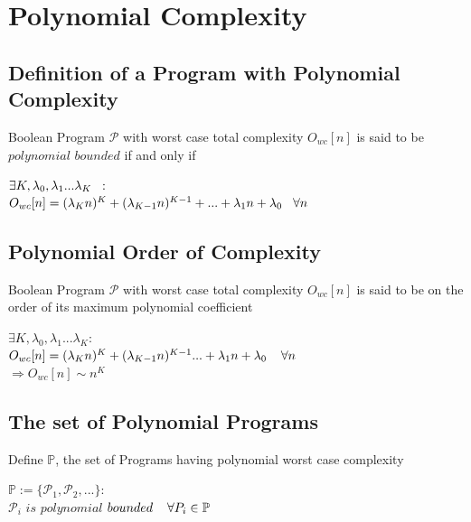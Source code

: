 \documentclass[11pt]{article}
\begin{document}
\section{Polynomial Complexity}

\subsection{Definition of a Program with Polynomial Complexity}
Boolean Program $\mathcal{P}$ with worst case total complexity $O_{wc}[n]$ is said to be $polynomial$ $bounded$ if and only if
\begin{center}
\vspace{1mm}
$\exists K, \lambda_0, \lambda_1...\lambda_K \hspace{2mm} :$
\\ \vspace{2mm}
$O_{wc}[n] = (\lambda_K n)^K + (\lambda_{K-1} n)^{K-1} + ... + \lambda_1 n + \lambda_0 \hspace{3mm} \forall n$
\end{center}


\subsection{Polynomial Order of Complexity}
Boolean Program $\mathcal{P}$ with worst case total complexity $O_{wc}[n]$ is said to be on the order of its maximum polynomial coefficient
\begin{center}
\vspace{1mm}
$
\exists K,\lambda_0,\lambda_1...\lambda_K : 
$
\\ \vspace{2mm}
$O_{wc}[n] = (\lambda_{K} n)^{K} + (\lambda_{K-1} n)^{K-1}... + \lambda_1 n +  \lambda_0 \hspace{4mm} \forall n$
\\ \vspace{2mm}
$
\Rightarrow O_{wc}[n] \sim n^K
$
\end{center}


\subsection{The set of Polynomial Programs}
Define $\mathbb{P}$, the set of Programs having polynomial worst case complexity
\begin{center}
$
\mathbb{P} := \{\mathcal{P}_1,\mathcal{P}_2,...\} : 
$
\\ \vspace{4mm}
$
\mathcal{P}_i$ $is$ $polynomial$ $bounded \hspace{4mm} \forall P_i \in \mathbb{P}
$
\end{center}
\end{document}
